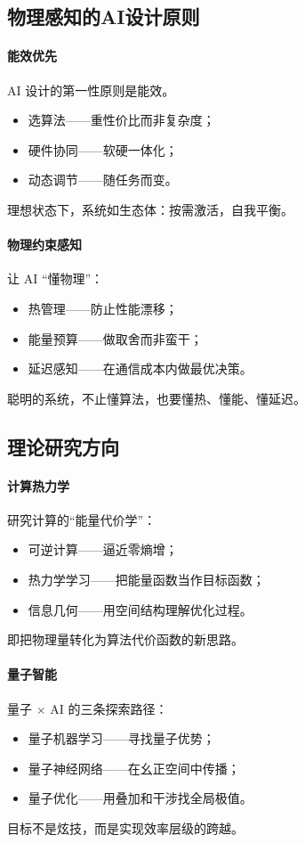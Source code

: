 \subsection{物理感知的AI设计原则}

\paragraph{能效优先}
AI 设计的第一性原则是能效。  
\begin{itemize}
\item 选算法——重性价比而非复杂度；
\item 硬件协同——软硬一体化；
\item 动态调节——随任务而变。
\end{itemize}
理想状态下，系统如生态体：按需激活，自我平衡。

\paragraph{物理约束感知}
让 AI “懂物理”：
\begin{itemize}
\item 热管理——防止性能漂移；
\item 能量预算——做取舍而非蛮干；
\item 延迟感知——在通信成本内做最优决策。
\end{itemize}
聪明的系统，不止懂算法，也要懂热、懂能、懂延迟。

\subsection{理论研究方向}

\paragraph{计算热力学}
研究计算的“能量代价学”：
\begin{itemize}
\item 可逆计算——逼近零熵增；
\item 热力学学习——把能量函数当作目标函数；
\item 信息几何——用空间结构理解优化过程。
\end{itemize}
即把物理量转化为算法代价函数的新思路。

\paragraph{量子智能}
量子 $\times $ AI 的三条探索路径：
\begin{itemize}
\item 量子机器学习——寻找量子优势；
\item 量子神经网络——在幺正空间中传播；
\item 量子优化——用叠加和干涉找全局极值。
\end{itemize}
目标不是炫技，而是实现效率层级的跨越。

